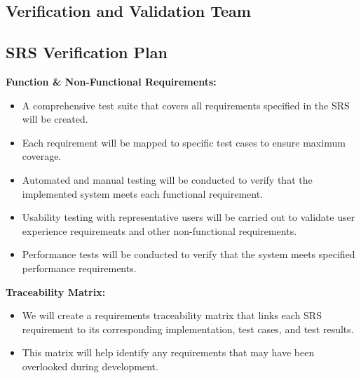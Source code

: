 \documentclass[12pt, titlepage]{article}
\begin{document}

\subsection{Verification and Validation Team}


\subsection{SRS Verification Plan}

\textbf{Function \& Non-Functional Requirements:}
\begin{itemize}
    \item A comprehensive test suite that covers all requirements specified in the SRS will be created.
    \item Each requirement will be mapped to specific test cases to ensure maximum coverage.
    \item Automated and manual testing will be conducted to verify that the implemented system meets each functional requirement.
    \item Usability testing with representative users will be carried out to validate user experience requirements and other non-functional requirements.
    \item Performance tests will be conducted to verify that the system meets specified performance requirements.
\end{itemize}

\textbf{Traceability Matrix:}
\begin{itemize}
    \item We will create a requirements traceability matrix that links each SRS requirement to its corresponding implementation, test cases, and test results.
    \item This matrix will help identify any requirements that may have been overlooked during development.
\end{itemize}
\end{document}
